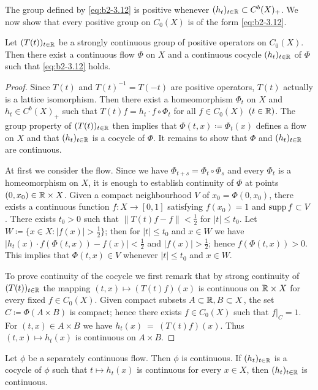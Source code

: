 The group defined by \eqref{eq:b2-3.12} is positive whenever $(h_t)_{t \in \mathbb{R}} \subset C^{b} (X)_+$.
We now show that every positive group on $C_0(X)$ is of the form \eqref{eq:b2-3.12}.
\begin{proposition}\label{prop:b2-3.9}
Let $(T(t))_{t \in \mathbb{R}}$ be a strongly continuous group of positive operators on $C_0(X)$.
Then there exist a continuous flow $\Phi$ on $X$ and a continuous cocycle $(h_t)_{t \in \mathbb{R}}$ of $\Phi$ such that \eqref{eq:b2-3.12} holds.
\end{proposition}
\begin{proof}
Since $T(t)$ and $T(t)^{-1} = T(-t)$ are positive operators, $T(t)$ actually is a lattice isomorphism.
Then there exist a homeomorphism $\Phi_t$ on $X$ and $h_t \in C^{b}(X)_+$ such that $T(t)f = h_t \cdot f \circ \Phi_t$ for all $f \in C_0(X)$ $(t \in \mathbb{R})$.
The group property of $(T(t))_{t \in \mathbb{R}}$ then implies that $\Phi(t,x) \coloneqq \Phi_t(x)$ defines a flow on $X$ and that $(h_t)_{t \in \mathbb{R}}$ is a cocycle of $\Phi$.
It remains to show that $\Phi$ and $(h_t)_{t \in \mathbb{R}}$ are continuous.

At first we consider the flow.
Since we have $\Phi_{t+s} = \Phi_t \circ \Phi_s$ and every $\Phi_t$ is a homeomorphism on $X$, it is enough to establish continuity of $\Phi$ at points $(0,x_0) \in \mathbb{R} \times X$.
Given a compact neighbourhood $V$ of $x_0 = \Phi (0,x_0)$, there exists a continuous function $f \colon X \to [0,1]$ satisfying $f(x_0) = 1$ and $\mathop{}\!\mathrm{supp}\, f \subset V$.
There exists $t_0 > 0$ such that $\|T(t)f - f\| < \frac{1}{2}$ for $|t| \leq t_0$.
Let $W \coloneqq \{x \in X \colon |f(x)| > \frac{1}{2}\}$; then for $|t| \leq t_0$ and $x \in W$ we have $|h_t(x) \cdot f(\Phi(t,x)) - f(x)| < \frac{1}{2}$ and $|f(x)| > \frac{1}{2}$; hence $f(\Phi (t,x)) > 0$.
This implies that $\Phi (t,x) \in V$ whenever $|t| \leq t_0$ and $x \in W$.

To prove continuity of the cocycle we first remark that by strong continuity of $(T(t))_{t \in \mathbb{R}}$ the mapping $(t,x) \mapsto (T(t)f) (x)$ is continuous on $\mathbb{R} \times X$ for every fixed $f \in C_0(X)$.
Given compact subsets $A \subset \mathbb{R} , B \subset X$, the set $C \coloneqq \Phi(A \times B)$ is compact; hence there exists $f \in C_0(X)$ such that $f|_{C} = 1$.
For $(t,x) \in A \times B$ we have $h_t(x)~=~(T(t)f) (x)$.
Thus $(t,x) \mapsto h_t(x)$ is continuous on $A \times B$.
\end{proof}

\begin{corollary}\label{cor:b2-3.10}
Let $\phi$ be a separately continuous flow.
Then $\phi$ is continuous.
If $(h_t)_{t \in \mathbb{R}}$ is a cocycle of $\phi$ such that $t \mapsto h_t (x)$ is continuous for every $x \in X$, then $(h_t)_{t \in \mathbb{R}}$ is continuous.
\end{corollary}

